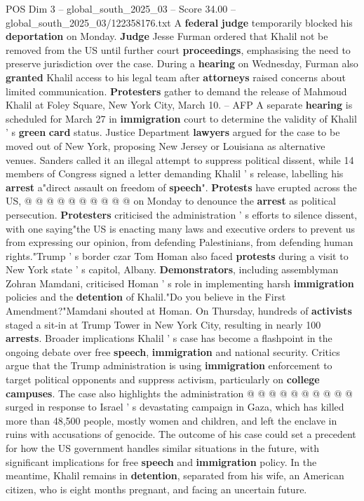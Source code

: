 \begin{textsample}{POS Dim 3 – global\_south\_2025\_03 – Score 34.00 – global\_south\_2025\_03/122358176.txt}
A \textbf{federal} \textbf{judge} temporarily blocked his \textbf{deportation} on Monday. \textbf{Judge} Jesse Furman ordered that Khalil not be removed from the US until further court \textbf{proceedings}, emphasising the need to preserve jurisdiction over the case.
During a \textbf{hearing} on Wednesday, Furman also \textbf{granted} Khalil access to his legal team after \textbf{attorneys} raised concerns about limited communication. \textbf{Protesters} gather to demand the release of Mahmoud Khalil at Foley Square, New York City, March 10. -- AFP A separate \textbf{hearing} is scheduled for March 27 in \textbf{immigration} court to determine the validity of Khalil ' s \textbf{green} \textbf{card} status.
Justice Department \textbf{lawyers} argued for the case to be moved out of New York, proposing New Jersey or Louisiana as alternative venues.
Sanders called it an illegal attempt to suppress political dissent, while 14 members of Congress signed a letter demanding Khalil ' s release, labelling his \textbf{arrest} a"direct assault on freedom of \textbf{speech}". \textbf{Protests} have erupted across the US, @ @ @ @ @ @ @ @ @ @ on Monday to denounce the \textbf{arrest} as political persecution. \textbf{Protesters} criticised the administration ' s efforts to silence dissent, with one saying"the US is enacting many laws and executive orders to prevent us from expressing our opinion, from defending Palestinians, from defending human rights."Trump ' s border czar Tom Homan also faced \textbf{protests} during a visit to New York state ' s capitol, Albany. \textbf{Demonstrators}, including assemblyman Zohran Mamdani, criticised Homan ' s role in implementing harsh \textbf{immigration} policies and the \textbf{detention} of Khalil."Do you believe in the First Amendment?"Mamdani shouted at Homan.
On Thursday, hundreds of \textbf{activists} staged a sit-in at Trump Tower in New York City, resulting in nearly 100 \textbf{arrests}.
Broader implications Khalil ' s case has become a flashpoint in the ongoing debate over free \textbf{speech}, \textbf{immigration} and national security.
Critics argue that the Trump administration is using \textbf{immigration} enforcement to target political opponents and suppress activism, particularly on \textbf{college} \textbf{campuses}.
The case also highlights the administration @ @ @ @ @ @ @ @ @ @ surged in response to Israel ' s devastating campaign in Gaza, which has killed more than 48,500 people, mostly women and children, and left the enclave in ruins with accusations of genocide.
The outcome of his case could set a precedent for how the US government handles similar situations in the future, with significant implications for free \textbf{speech} and \textbf{immigration} policy.
In the meantime, Khalil remains in \textbf{detention}, separated from his wife, an American citizen, who is eight months pregnant, and facing an uncertain future.


\end{textsample}
